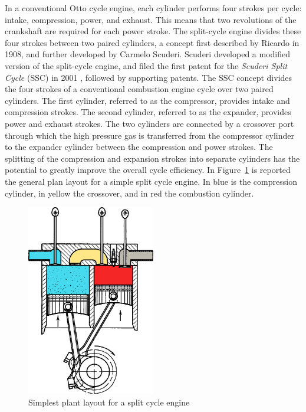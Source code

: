 In a conventional Otto cycle engine, each cylinder performs four strokes per cycle: intake, compression, power, and exhaust. This means that two revolutions of the crankshaft are required for each power stroke. The split-cycle engine divides these four strokes between two paired cylinders, a concept first described by Ricardo in 1908, and further developed by Carmelo Scuderi. Scuderi developed a modified version of the split-cycle engine, and filed the first patent for the \emph{Scuderi Split Cycle} (SSC) in 2001 \cite{Scuderi2003}, followed by supporting patents. The SSC concept divides the four strokes of a conventional combustion engine cycle over two paired cylinders. The first cylinder, referred to as the compressor, provides intake and compression strokes. The second cylinder, referred to as the expander, provides power and exhaust strokes. The two cylinders are connected by a crossover port through which the high pressure gas is transferred from the compressor cylinder to the expander cylinder between the compression and power strokes. The splitting of the compression and expansion strokes into separate cylinders has the potential to greatly improve the overall cycle efficiency. In Figure~\ref{fig:split_simple} \cite{gentili2014split}  is reported the general plan layout for a simple split cycle engine. In blue is the compression cylinder, in yellow the crossover, and in red the combustion cylinder.

\begin{figure}[ht]
  \centering
  \includegraphics[width=0.5\textwidth]{figures/review/split_engine_view.png}
  \caption{Simplest plant layout for a split cycle engine\label{fig:split_simple} }
\end{figure}

